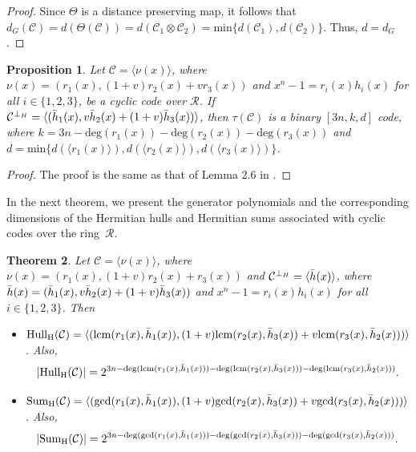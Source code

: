 \documentclass[pdflatex,sn-mathphys-num]{sn-jnl}%
\theoremstyle{thmstyleone}%
\newtheorem{theorem}{Theorem}%
\newtheorem{proposition}[theorem]{Proposition}%
\theoremstyle{thmstyletwo}%
\theoremstyle{thmstylethree}%
\begin{document}
\begin{proof}
Since $\Theta$ is a distance preserving map, it follows that $d_G(\mathcal{C})=d(\Theta(\mathcal{C}))=d(\mathcal{C}_1 \otimes \mathcal{C}_2)=\mathrm{min}\{d(\mathcal{C}_1),d(\mathcal{C}_2)\}$. Thus, $d=d_G$.
\end{proof}

\begin{proposition}\label{prop2}
Let $\mathcal{C}=\langle \nu(x)\rangle$, where $\nu(x)=(r_1(x),(1+v)r_2(x)+vr_3(x))$ and $x^n-1=r_i(x)h_i(x)$ for all $i\in \{1,2,3\}$, be a cyclic code over $\mathcal{R}$. If $\mathcal{C}^{\perp_H}=\langle (\Bar{h}_1(x),v\Bar{h}_2(x)+(1+v)\Bar{h}_3(x))\rangle$, then $\tau(\mathcal{C})$ is a binary $[3n,k,d]$ code, where $k=3n-\mathrm{deg}(r_1(x))-\mathrm{deg}(r_2(x))-\mathrm{deg}(r_3(x))$ and $d=\mathrm{min}\{d(\langle r_1(x)\rangle),d(\langle r_2(x)\rangle),d(\langle r_3(x)\rangle)\}$.
\end{proposition}

\begin{proof}
The proof is the same as that of Lemma 2.6 in \cite{euclideansum}.
\end{proof}
\noindent In the next theorem, we present the generator polynomials and the corresponding dimensions of the Hermitian hulls and Hermitian sums associated with cyclic codes over the ring~$\mathcal{R}$.

\begin{theorem}
\label{th3} Let $\mathcal{C}=\langle \nu(x)\rangle$, where $\nu(x)=(r_1(x),(1+v)r_2(x)+r_3(x))$ and $\mathcal{C}^{\perp_H}=\langle \Bar{h}(x)\rangle$, where $\Bar{h}(x)=(\Bar{h}_1(x),v \Bar{h}_2(x)+(1+v)\Bar{h}_3(x))$ and $x^n-1=r_i(x)h_i(x)$ for all $i\in \{1,2,3\}$. Then
\begin{itemize}
\item[(i)] $\mathrm{Hull_{H}}(\mathcal{C})=\langle (\mathrm{lcm}(r_{1}(x),\Bar{h}_{1}(x)),(1+v)\mathrm{lcm}(r_{2}(x),\Bar{h}_{3}(x))+v\mathrm{lcm}(r_{3}(x),\Bar{h}_{2}(x)))\rangle $. Also,
\begin{equation*}
|\mathrm{Hull_{H}}(\mathcal{C})|=2^{3n-\mathrm{\deg }(\mathrm{lcm}(r_{1}(x),\Bar{h}_{1}(x)))-\mathrm{\deg }(\mathrm{lcm}(r_{2}(x),\Bar{h}_{3}(x)))-\mathrm{\deg }(\mathrm{lcm}(r_{3}(x),\Bar{h}_{2}(x)))}.
\end{equation*}

\item[(ii)] $\mathrm{Sum_{H}}(\mathcal{C})=\langle (\mathrm{\gcd }(r_{1}(x),\Bar{h}_{1}(x)),(1+v)\mathrm{\gcd }(r_{2}(x),\Bar{h}_{3}(x))+v\mathrm{\gcd }(r_{3}(x),\Bar{h}_{2}(x)))\rangle $. Also,
\begin{equation*}
|\mathrm{Sum_{H}}(\mathcal{C})|=2^{3n-\mathrm{\deg }(\mathrm{\gcd }(r_{1}(x),\Bar{h}_{1}(x)))-\mathrm{\deg }(\mathrm{\gcd }(r_{2}(x),\Bar{h}_{3}(x)))-\mathrm{\deg }(\mathrm{\gcd }(r_{3}(x),\Bar{h}_{2}(x)))}.
\end{equation*}
\end{itemize}
\end{theorem}
\end{document}
